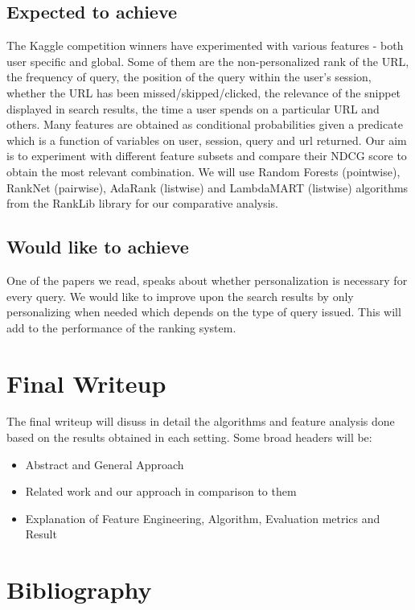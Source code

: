 \documentclass[11pt]{article}
\begin{document}
\subsection{Expected to achieve}
The Kaggle competition winners have experimented with various features - both user specific and global. Some of them are the non-personalized rank of the URL, the frequency of query, the position of the query within the user's session, whether the URL has been missed/skipped/clicked, the relevance of the snippet displayed in search results, the time a user spends on a particular URL and others. Many features are obtained as conditional probabilities given a predicate which is a function of variables on user, session, query and url returned.
\newline
Our aim is to experiment with different feature subsets and compare their NDCG score to obtain the most relevant combination. We will use Random Forests (pointwise), RankNet (pairwise), AdaRank (listwise) and LambdaMART (listwise) algorithms from the RankLib library for our comparative analysis.
\subsection{Would like to achieve}
One of the papers we read, speaks about whether personalization is necessary for every query. We would like to improve upon the search results by only personalizing when needed which depends on the type of query issued. This will add to the performance of the ranking system.
\section{Final Writeup} The final writeup will disuss in detail the algorithms and feature analysis done based on the results obtained in each setting. Some broad headers will be:\\
\vspace{-5mm} 
\begin{itemize}\setlength{\itemsep}{-5pt}
\item Abstract and General Approach
\item Related work and our approach in comparison to them
\item Explanation of Feature Engineering, Algorithm, Evaluation metrics and Result  
\end{itemize}
\noindent
\section{Bibliography}
\end{document}
